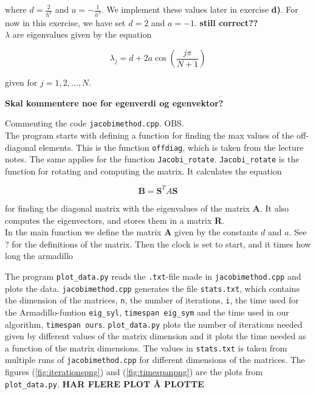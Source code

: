 \documentclass{article}
\begin{document}
\begin{multicols}{2}
where $d = \frac{2}{h^2}$ and $a = - \frac{1}{h^2}$. We implement these values later in exercise \textbf{d)}. For now in this exercise, we have set $d = 2$ and $a = - 1$.
\textbf{still correct??} \\

$\lambda$ are eigenvalues given by the equation

\begin{equation*}
    \lambda_j = d + 2a \cos \left( \frac{j \pi }{N + 1} \right)
\end{equation*}

given for $ j = 1, 2, ..., N$.



\textbf{Skal kommentere noe for egenverdi og egenvektor?}

Commenting the code \texttt{jacobimethod.cpp}.  OBS. \\

The program starts with defining a function for finding the max values of the off-diagonal elements. This is the function \texttt{offdiag}, which is taken from the lecture notes. The same applies for the function \texttt{Jacobi\_rotate}. \texttt{Jacobi\_rotate} is the function for rotating and computing the matrix. It calculates the equation

\begin{equation*}
    \textbf{B} = \textbf{S}^T A \textbf{S}
\end{equation*}

for finding the diagonal matrix with the eigenvalues of the matrix \textbf{A}. It also computes the eigenvectors, and stores them in a matrix \textbf{R}. \\

In the main function we define the matrix \textbf{A} given by the constants $d$ and $a$. See ? for the definitions of the matrix. Then the clock is set to start, and it times how long the armadillo \\

\vspace{2cm}

The program \texttt{plot\_data.py} reads the \texttt{.txt}-file made in \texttt{jacobimethod.cpp} and plots the data. \texttt{jacobimethod.cpp} generates the file \texttt{stats.txt}, which contains the dimension of the matrices, \texttt{n}, the number of iterations, \texttt{i}, the time used for the Armadillo-funtion \texttt{eig\_syl}, \texttt{timespan eig\_sym} and the time used in our algorithm, \texttt{timespan ours}.
\texttt{plot\_data.py} plots the number of iterations needed given by different values of the matrix dimension and it plots the time needed as a function of the matrix dimensions. The values in \texttt{stats.txt} is taken from multiple runs of \texttt{jacobimethod.cpp} for different dimensions of the matrices. The figures (\ref{fig:iterationspng}) and (\ref{fig:timespanpng}) are the plots from \texttt{plot\_data.py}. \textbf{HAR FLERE PLOT Å PLOTTE} \\




\end{multicols}
\end{document}
